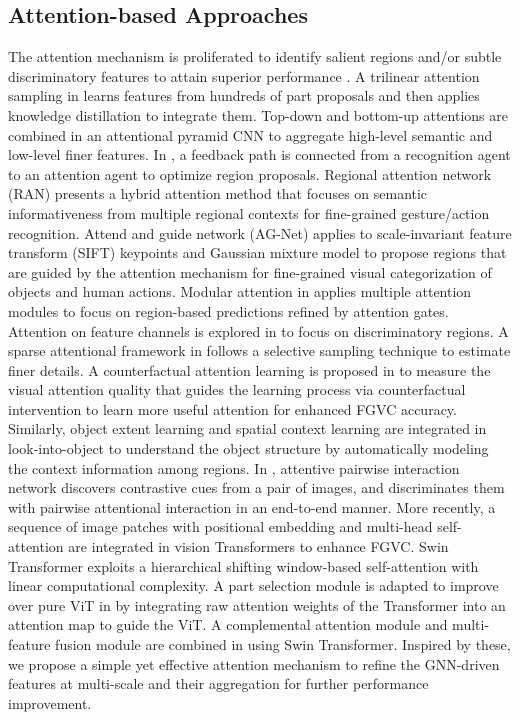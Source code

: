 \documentclass[journal]{IEEEtran}
\begin{document}
\subsection {Attention-based Approaches} 
The attention mechanism is proliferated to identify salient regions and/or subtle discriminatory features to attain superior performance \cite{behera2021context, behera2020regional, liu2019bidirectional,  lopez2020pay, zheng2019looking}. A trilinear attention sampling in \cite{zheng2019looking} learns features from hundreds of part proposals and then applies knowledge distillation to integrate them. Top-down and bottom-up attentions are combined in an attentional pyramid CNN \cite{ding2020weakly} to aggregate high-level semantic and low-level finer features. In \cite{liu2019bidirectional}, a feedback path is connected from a recognition agent to an attention agent to optimize region proposals. 
Regional attention network (RAN) \cite{behera2020regional} presents a hybrid attention method that focuses on semantic informativeness from multiple regional contexts for fine-grained gesture/action recognition. Attend and guide network (AG-Net) \cite{bera2021attend} applies to scale-invariant feature transform (SIFT) keypoints and Gaussian mixture model to propose regions that are guided by the attention mechanism for fine-grained visual categorization of objects and human actions. Modular attention in \cite{lopez2020pay} applies multiple attention modules to focus on region-based predictions refined by attention gates. Attention on feature channels is explored in \cite{chang2020devil} to focus on discriminatory regions. A sparse attentional framework in \cite{ding2019selective} follows a selective sampling technique to estimate finer details. A counterfactual attention learning is proposed in \cite{rao2021counterfactual} to measure the visual attention quality that guides the learning process via counterfactual intervention to learn more useful attention for enhanced FGVC accuracy. Similarly, object extent learning and spatial context learning are integrated in look-into-object \cite{zhou2020look} to understand the object structure by automatically modeling the context information among regions. In \cite{zhuang2020learning}, attentive pairwise interaction network discovers contrastive cues from a pair of images, and discriminates them with pairwise attentional interaction in an end-to-end manner. More recently, a sequence of image patches with positional embedding and multi-head self-attention are integrated in vision Transformers \cite{dosovitskiy2020image, liu2021swin, he2021transfg, miao2021complemental} to enhance FGVC. Swin Transformer \cite{liu2021swin} exploits a hierarchical shifting window-based self-attention with linear computational complexity. A part selection module is adapted to improve over pure ViT in \cite{he2021transfg} by integrating raw attention weights of the Transformer into an attention map to guide the ViT. A complemental attention module and multi-feature fusion module are combined in \cite{miao2021complemental} using Swin Transformer. Inspired by these, we propose a simple yet effective attention mechanism to refine the GNN-driven features at multi-scale and their aggregation for further performance improvement. 
\vspace{ -0.2cm}
\end{document}
